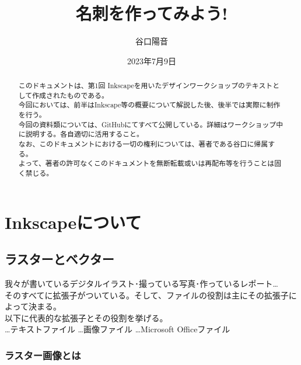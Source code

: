 \documentclass{ltjsarticle}
\begin{document}
\title{名刺を作ってみよう!}
\author{谷口陽音}
\date{2023年7月9日}
\maketitle

\begin{abstract}
  このドキュメントは、第1回 Inkscapeを用いたデザインワークショップのテキストとして作成されたものである。\\
  今回においては、前半はInkscape等の概要について解説した後、後半では実際に制作を行う。\\
  今回の資料類については、GitHubにてすべて公開している。詳細はワークショップ中に説明する。各自適切に活用すること。\\

  なお、このドキュメントにおける一切の権利については、著者である谷口に帰属する。\\
  よって、著者の許可なくこのドキュメントを無断転載或いは再配布等を行うことは固く禁じる。
\end{abstract}

\section{Inkscapeについて}
\subsection{ラスターとベクター}
我々が書いているデジタルイラスト･撮っている写真･作っているレポート\dots \\
そのすべてに拡張子がついている。そして、ファイルの役割は主にその拡張子によって決まる。\\
以下に代表的な拡張子とその役割を挙げる。\\
\dots テキストファイル
\dots 画像ファイル
\dots Microsoft Officeファイル
\subsubsection{ラスター画像とは}
\end{document}
